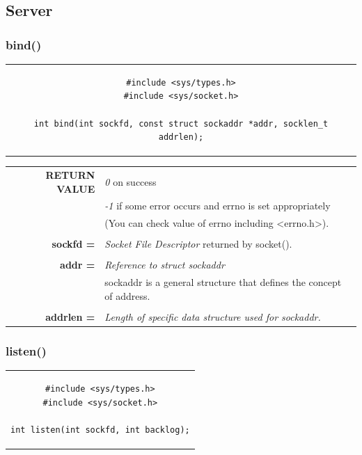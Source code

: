 \clearpage
\subsection{Server}
\subsubsection{bind()}
\begin{center}
\begin{tabular}{c}
\begin{lstlisting}[linewidth=350pt, basicstyle=\footnotesize\sffamily,]
#include <sys/types.h>
#include <sys/socket.h>

int bind(int sockfd, const struct sockaddr *addr, socklen_t addrlen);
\end{lstlisting}
\end{tabular}
\end{center}

\begin{table}[h]
\centering
\begin{tabular}{rcl}
\textbf{RETURN VALUE} & \multicolumn{2}{l}{\textit{0} on success}\\
{} & \multicolumn{2}{l}{\textit{-1} if some error occurs and errno is set appropriately}\\
{} & \multicolumn{2}{l}{(You can check value of errno including <errno.h>).}\\
& & \\
\textbf{sockfd =} & \multicolumn{2}{l}{\textit{Socket File Descriptor} returned by socket().}\\
& &\\
\textbf{addr =} & \multicolumn{2}{l}{\textit{Reference to struct sockaddr}}\\
{} & \multicolumn{2}{l}{sockaddr is a general structure that defines the concept of address.}\\
& & \\
\textbf{addrlen =} & \multicolumn{2}{l}{\textit{Length of specific data structure used for sockaddr.}}\\
\end{tabular}
\end{table}

\subsubsection{listen()}
\begin{center}
\begin{tabular}{c}
\begin{lstlisting}[linewidth=185pt, basicstyle=\footnotesize\sffamily,]
#include <sys/types.h>
#include <sys/socket.h>

int listen(int sockfd, int backlog);
\end{lstlisting}
\end{tabular}
\end{center}

